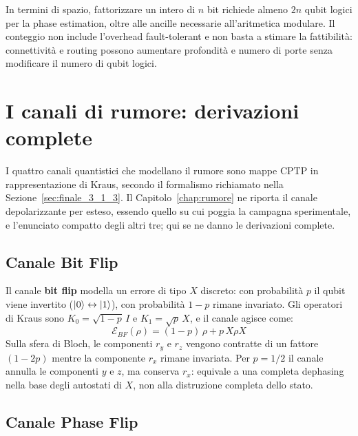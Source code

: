 In termini di spazio, fattorizzare un intero di $n$ bit richiede almeno
$2n$ qubit logici per la phase estimation, oltre alle ancille necessarie
all'aritmetica modulare. Il conteggio non include l'overhead fault-tolerant e
non basta a stimare la fattibilità: connettività e routing possono aumentare
profondità e numero di porte senza modificare il numero di qubit logici.


\section{I canali di rumore: derivazioni complete}
\label{app:canali}

I quattro canali quantistici che modellano il rumore sono mappe \ac{CPTP} in
rappresentazione di Kraus, secondo il formalismo richiamato nella
Sezione~\ref{sec:finale_3_1_3}. Il Capitolo~\ref{chap:rumore} ne riporta il
canale depolarizzante per esteso, essendo quello su cui poggia la campagna
sperimentale, e l'enunciato compatto degli altri tre; qui se ne danno le
derivazioni complete.

\subsection{Canale Bit Flip}

Il canale \textbf{bit flip} modella un errore di tipo $X$ discreto: con probabilità $p$ il qubit viene invertito ($\ket{0}\leftrightarrow\ket{1}$), con probabilità $1-p$ rimane invariato. Gli operatori di Kraus sono $K_0 = \sqrt{1-p}\,I$ e $K_1 = \sqrt{p}\,X$, e il canale agisce come:
\begin{equation}
    \mathcal{E}_{BF}(\rho) = (1-p)\,\rho + p\,X\rho X
    \label{eq:bitflip}
\end{equation}
Sulla sfera di Bloch, le componenti $r_y$ e $r_z$ vengono contratte di un fattore $(1-2p)$ mentre la componente $r_x$ rimane invariata. Per $p=1/2$ il canale annulla le componenti $y$ e $z$, ma conserva $r_x$: equivale a una completa dephasing nella base degli autostati di $X$, non alla distruzione completa dello stato.

\subsection{Canale Phase Flip}

